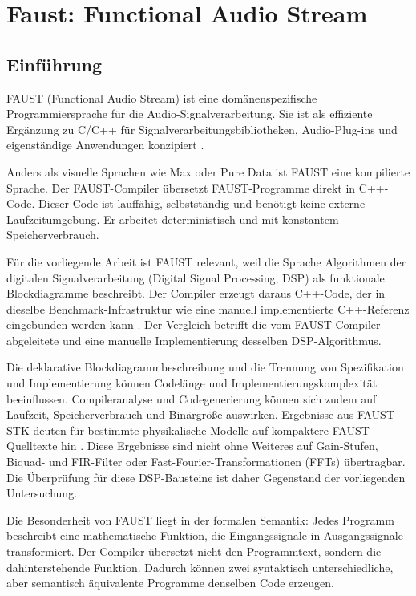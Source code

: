 \chapter{Faust: Functional Audio Stream}
\label{cha:faust}
\section{Einführung}

FAUST (Functional Audio Stream) ist eine domänenspezifische Programmiersprache für die Audio-Signalverarbeitung. Sie ist als effiziente Ergänzung zu C/C++ für Signalverarbeitungsbibliotheken, Audio-Plug-ins und eigenständige Anwendungen konzipiert \parencite{orlarey:hal-02159014}.

Anders als visuelle Sprachen wie Max oder Pure Data ist FAUST eine kompilierte Sprache. Der FAUST-Compiler übersetzt FAUST-Programme direkt in C++-Code. Dieser Code ist lauffähig, selbstständig und benötigt keine externe Laufzeitumgebung. Er arbeitet deterministisch und mit konstantem Speicherverbrauch.
\cite[Vgl.][S. 2]{orlarey:hal-02159014}

Für die vorliegende Arbeit ist FAUST relevant, weil die Sprache Algorithmen der digitalen Signalverarbeitung (Digital Signal Processing, DSP) als funktionale Blockdiagramme beschreibt. Der Compiler erzeugt daraus C++-Code, der in dieselbe Benchmark-Infrastruktur wie eine manuell implementierte C++-Referenz eingebunden werden kann \parencite[S.~2--3]{orlarey:hal-02159014}. Der Vergleich betrifft die vom FAUST-Compiler abgeleitete und eine manuelle Implementierung desselben DSP-Algorithmus.

Die deklarative Blockdiagrammbeschreibung und die Trennung von Spezifikation und Implementierung können Codelänge und Implementierungskomplexität beeinflussen. Compileranalyse und Codegenerierung können sich zudem auf Laufzeit, Speicherverbrauch und Binärgröße auswirken. Ergebnisse aus FAUST-STK deuten für bestimmte physikalische Modelle auf kompaktere FAUST-Quelltexte hin \parencite[S.~5--6]{michon2011fauststk}. Diese Ergebnisse sind nicht ohne Weiteres auf Gain-Stufen, Biquad- und FIR-Filter oder Fast-Fourier-Transformationen (FFTs) übertragbar. Die Überprüfung für diese DSP-Bausteine ist daher Gegenstand der vorliegenden Untersuchung.

Die Besonderheit von FAUST liegt in der formalen Semantik: Jedes Programm beschreibt eine mathematische Funktion, die Eingangssignale in Ausgangssignale transformiert. Der Compiler übersetzt nicht den Programmtext, sondern die dahinterstehende Funktion. Dadurch können zwei syntaktisch unterschiedliche, aber semantisch äquivalente Programme denselben Code erzeugen.
\parencite{orlarey:hal-02159014}

